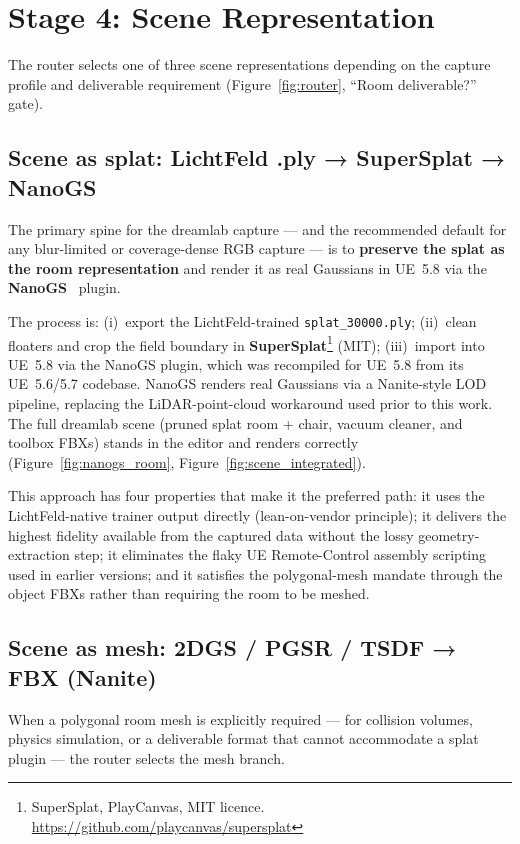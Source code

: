\section{Stage 4: Scene Representation}
\label{sec:method:scene}

The router selects one of three scene representations depending on the capture profile and
deliverable requirement (Figure~\ref{fig:router}, ``Room deliverable?'' gate).

\subsection{Scene as splat: LichtFeld .ply → SuperSplat → NanoGS}
\label{sec:method:scene:splat}
The primary spine for the dreamlab capture --- and the recommended default for any
blur-limited or coverage-dense RGB capture --- is to \textbf{preserve the splat as the
room representation} and render it as real Gaussians in UE~5.8 via the
\textbf{NanoGS}~\cite{nanogs2026} plugin.

The process is: (i)~export the LichtFeld-trained \texttt{splat\_30000.ply}; (ii)~clean
floaters and crop the field boundary in \textbf{SuperSplat}\footnote{SuperSplat, PlayCanvas, MIT licence. \url{https://github.com/playcanvas/supersplat}} (MIT);
(iii)~import into UE~5.8 via the NanoGS plugin, which was recompiled for UE~5.8 from its
UE~5.6/5.7 codebase.  NanoGS renders real Gaussians via a Nanite-style LOD pipeline,
replacing the LiDAR-point-cloud workaround used prior to this work.  The full dreamlab
scene (pruned splat room + chair, vacuum cleaner, and toolbox FBXs) stands in the editor
and renders correctly (Figure~\ref{fig:nanogs_room}, Figure~\ref{fig:scene_integrated}).

This approach has four properties that make it the preferred path: it uses the
LichtFeld-native trainer output directly (lean-on-vendor principle); it delivers the
highest fidelity available from the captured data without the lossy geometry-extraction
step; it eliminates the flaky UE Remote-Control assembly scripting used in earlier
versions; and it satisfies the polygonal-mesh mandate through the object FBXs rather than
requiring the room to be meshed.

\subsection{Scene as mesh: 2DGS / PGSR / TSDF → FBX (Nanite)}
\label{sec:method:scene:mesh}
When a polygonal room mesh is explicitly required --- for collision volumes, physics
simulation, or a deliverable format that cannot accommodate a splat plugin --- the router
selects the mesh branch.

